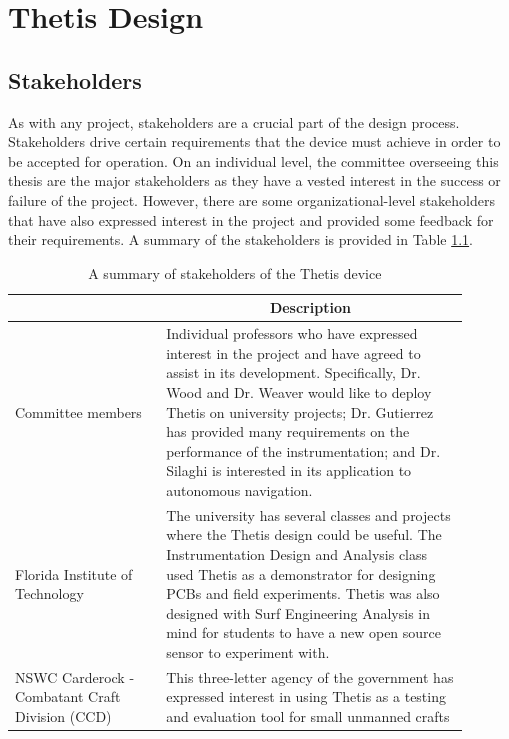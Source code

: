 \chapter{Thetis Design} \label{chap:thetis_design}

\section{Stakeholders} \label{sec:stakeholders}
As with any project, stakeholders are a crucial part of the design process.
Stakeholders drive certain requirements that the device must achieve in order to be accepted for operation.
On an individual level, the committee overseeing this thesis are the major stakeholders as they have a vested interest in the success or failure of the project.
However, there are some organizational-level stakeholders that have also expressed interest in the project and provided some feedback for their requirements.
A summary of the stakeholders is provided in Table \ref{tab:stakeholders}.

\begin{table}
	\caption{A summary of stakeholders of the Thetis device}
	\label{tab:stakeholders}
	\centering
	\begin{tabular}{|p{0.3\linewidth} | p{0.6\linewidth}|}
		\hline
		\rowcolor[gray]{0.8}
		\multicolumn{1}{|c|}{\textbf{Stakeholder}} & \multicolumn{1}{|c|}{\textbf{Description}} \\
		\hline
		Committee members & Individual professors who have expressed interest in the project and have agreed to assist in its development. Specifically, Dr. Wood and Dr. Weaver would like to deploy Thetis on university projects; Dr. Gutierrez has provided many requirements on the performance of the instrumentation; and Dr. Silaghi is interested in its application to autonomous navigation. \\
		\hline
		Florida Institute of \newline Technology & The university has several classes and projects where the Thetis design could be useful. The Instrumentation Design and Analysis class used Thetis as a demonstrator for designing PCBs and field experiments. Thetis was also designed with Surf Engineering Analysis in mind for students to have a new open source sensor to experiment with. \\
		\hline
		NSWC Carderock - \newline Combatant Craft Division (CCD) & This three-letter agency of the government has expressed interest in using Thetis as a testing and evaluation tool for small unmanned crafts \\
		\hline
	\end{tabular}
\end{table}

